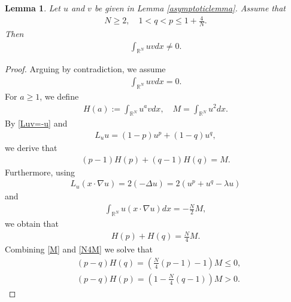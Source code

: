 \documentclass{article}
\newtheorem{lemma}[theorem]{Lemma}
\theoremstyle{definition} \theoremstyle{remark}
\numberwithin{equation}{section}
\newcommand{\R}{\mathbb{R}}
\newcommand{\la}{\lambda}
\begin{document}
	\begin{lemma} \label{intuvneq0}
		Let $u$ and $v$ be given in Lemma \ref{asymptoticlemma}. Assume that
		\begin{align*}
			N\ge 2, \quad 1 < q < p \le 1 + \frac{4}{N}.
		\end{align*}
		Then
		\begin{align*}
			\int_{\R^N}uv dx \neq 0.
		\end{align*}
	\end{lemma}

	\begin{proof}
		Arguing by contradiction, we assume
		\begin{align*}
			\int_{\R^N}uv dx = 0.
		\end{align*}
		For $a \ge 1$, we define
		\begin{align*}
			H(a) := \int_{\R^N}u^avdx, \quad M = \int_{\R^N}u^2dx.
		\end{align*}
		By \eqref{Luv=-u} and
		\begin{align*}
			L_u u = (1-p)u^p + (1-q)u^q,
		\end{align*}
		we derive that
		\begin{align} \label{M}
			(p-1)H(p) + (q-1)H(q) = M.
		\end{align}
		Furthermore, using
		\begin{align*}
			L_u\left(x\cdot \nabla u\right) = 2(-\Delta u) = 2 \left(u^p + u^q - \la u\right)
		\end{align*}
		and
		\begin{align*}
			\int_{\R^N}u \left(x \cdot \nabla u\right)dx = -\frac{N}{2}M,
		\end{align*}
		we obtain that
		\begin{align} \label{N4M}
			H(p) + H(q) = \frac{N}{4}M.
		\end{align}
		Combining \eqref{M} and \eqref{N4M} we solve that
		\begin{align}
			& (p-q)H(q) = \left(\frac{N}{4}(p-1) - 1\right)M \le 0, \label{eqp-qHq} \\
			& (p-q)H(p) = \left(1 - \frac{N}{4}(q-1)\right)M > 0. \label{eqp-qHp}
		\end{align}


\end{proof}
\end{document}
